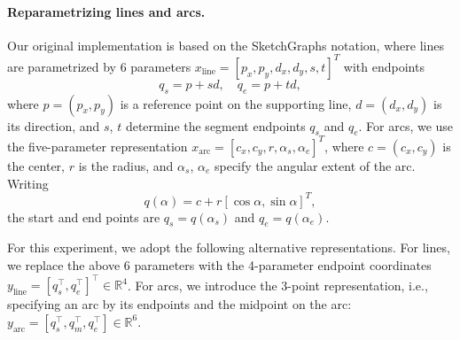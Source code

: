 \paragraph{Reparametrizing lines and arcs.}
Our original implementation is based on the SketchGraphs \cite{seff2020sketchgraphs} notation, where lines are parametrized by 6 parameters $x_\mathrm{line} = [p_x, p_y, d_x, d_y, s, t]^T$ with endpoints
\begin{equation}
q_s = p + sd,\quad q_e = p + td,
\end{equation}
where $p = (p_x, p_y)$ is a reference point on the supporting line, $d = (d_x, d_y)$ is its direction, and $s$, $t$ determine the segment endpoints $q_s$ and $q_e$.
For arcs, we use the five-parameter representation
$x_\mathrm{arc} = [c_x,c_y,r,\alpha_s,\alpha_e]^T$, where $c=(c_x,c_y)$ is the center, $r$ is the radius, and $\alpha_s$, $\alpha_e$ specify the angular extent of the arc. Writing
\begin{equation}
q(\alpha)=c+r[\cos\alpha,\sin\alpha]^T,
\end{equation}
the start and end points are $q_s=q(\alpha_s)$ and $q_e=q(\alpha_e)$.

For this experiment, we adopt the following alternative representations.
For lines, we replace the above 6 parameters with the 4-parameter endpoint coordinates $y_\mathrm{line}=[q_s^\top, q_e^\top]^\top \in \mathbb{R}^4$. For arcs, we introduce the 3-point representation, i.e., specifying an arc by its endpoints and the midpoint on the arc: $y_\mathrm{arc}=[q_s^\top, q_m^\top, q_e^\top]\in\mathbb{R}^6$.

